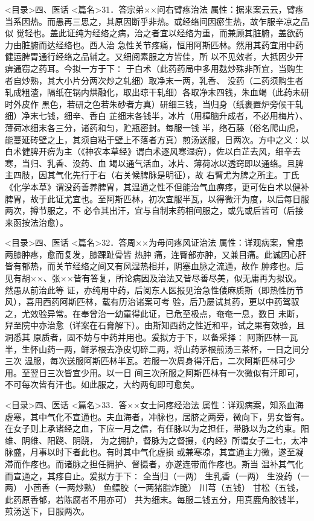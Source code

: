 \documentclass[a4paper,12pt,UTF8,twoside]{ctexbook}
\begin{document}
<目录>四、医话
<篇名>31．答宗弟××问右臂疼治法
属性：据来案云云，臂疼当系因热。而愚再三思之，其原因断乎非热。或经络间因瘀生热，故乍服辛凉之品似 
觉轻也。盖此证纯为经络之病，治之者宜以经络为重，而兼顾其脏腑，盖欲药力由脏腑而达经络也。西人治 
急性关节疼痛，恒用阿斯匹林。然用其药宜用中药健运脾胃通行经络之品辅之。又细阅素服之方皆佳，所 
以不见效者，大抵因少开痹通窃之药耳。今拟一方于下∶ 
于白术（此药药局中多用麸炒殊非所宜，当购生者自炒熟，其大小片分两次炒之轧细）取净末一两，乳香、 
没药（二药须购生者轧成粗渣，隔纸在锅内烘融化，取出晾干轧细）各取净末四钱，朱血竭（此药未研时外皮作 
黑色，若研之色若朱砂者方真）研细三钱，当归身（纸裹置炉旁候干轧细）净末七钱，细辛、香白 
芷细末各钱半，冰片（用樟脑升成者，不必用梅片）、薄荷冰细末各三分，诸药和匀，贮瓶密封。每服一钱 
半，络石藤（俗名爬山虎，能蔓延砖壁之上，其须自粘于壁上不落者方真）煎汤送服，日两次。方中之义∶以 
白术健脾开痹为主（《神农本草经》谓白术逐风寒湿痹），佐以白芷去风，细辛去寒，当归、乳香、没药、血 
竭以通气活血，冰片、薄荷冰以透窍即以通络。且脾主四肢，因其气化先行于右（右关候脾脉是明征），故 
右臂尤为脾之所主。丁氏《化学本草》谓没药善养脾胃，其温通之性不但能治气血痹疼，更可佐白术以健补 
脾胃，故于此证尤宜也。至阿斯匹林，初次宜服半瓦，以得微汗为度，以后每日服两次，撙节服之，不 
必令其出汗，宜与自制末药相间服之，或先或后皆可（后接来函按法治愈）。 

<目录>四、医话
<篇名>32．答周××为母问疼风证治法
属性：详观病案，曾患两膝肿疼，愈而复发，膝踝趾骨皆 热肿 
痛，连臀部亦肿，又兼目痛。此诚因心肝皆有郁热，而关节经络之间又有风湿热相并，阴塞血脉之流通，故作 
肿疼也。后见有胡××、张××皆有答复，所论病因及治法又皆尽善尽美，似无庸再为拟议。然愚从前治此等 
证，亦纯用中药，后阅东人医报见治急性偻麻质斯（即热性历节风），喜用西药阿斯匹林，载有历治诸案可考 
验，后乃屡试其药，更以中药驾驭之，尤效验异常。在奉曾治一幼童得此证，已危至极点，奄奄一息，数日 
未断，舁至院中亦治愈（详案在石膏解下）。由斯知西药之性近和平，试之果有效验，且洞悉其 
原质者，固不妨与中药并用也。爰拟方于下，以备采择∶ 
阿斯匹林一瓦半，生怀山药一两，鲜茅根去净皮切碎二两，将山药茅根煎汤三茶杯，一日之间分三次 
温服，每次送服阿斯匹林半瓦。若服一次周身得汗后，二次阿斯匹林可少用。至翌日三次皆宜少用。以一日 
间三次所服之阿斯匹林有一次微似有汗即可，不可每次皆有汗也。如此服之，大约两旬即可愈矣。 

<目录>四、医话
<篇名>33．答××女士问疼经治法
属性：详观病案，知系血海虚寒，其中气化不宣通也。夫血海者，冲脉也，居脐之两旁，微向下，男女皆有。 
在女子则上承诸经之血，下应一月之信，有任脉以为之担任，带脉以为之约束。阳维、阴维、阳跷、阴跷， 
为之拥护，督脉为之督摄，《内经》所谓女子二七，太冲脉盛，月事以时下者此也。有时其中气化虚损 
或兼寒凉，其宣通主力微，遂至凝滞而作疼也。而诸脉之担任拥护、督摄者，亦遂连带而作疼也。斯当 
温补其气化而宣通之，其疼自止。爰拟方于下∶ 
全当归（一两） 生乳香（一两） 生没药（一两） 小茴香（一两炒熟） 
鱼鳔胶（一两猪脂炸脆） 川芎（五钱） 甘松（五钱，此药原香郁，若陈腐者不用亦可） 
共为细末。每服二钱五分，用真鹿角胶钱半，煎汤送下，日服两次。 
\end{document}
